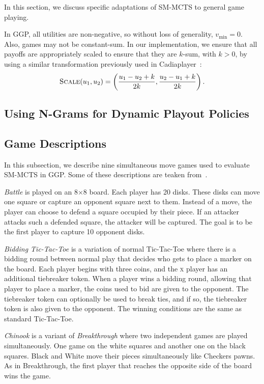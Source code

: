 \documentclass[conference]{IEEEtran}
\begin{document}
In this section, we discuss specific adaptations of SM-MCTS to general game playing.

In GGP, all utilities are non-negative, so without loss of generality, $v_{\min} = 0$. 
Also, games may not be constant-sum. In our implementation, we ensure that all payoffs 
are appropriately scaled to ensure that they are $k$-sum, with $k > 0$, by using 
a similar transformation previously used in Cadiaplayer~\cite{Finnsson12}:
\[ \text{\sc Scale}(u_1, u_2) = \left( \frac{u_1 - u_2 + k}{2k}, \frac{u_2 - u_1 + k}{2k} \right). \]

\subsection{Using N-Grams for Dynamic Playout Policies}

\subsection{Game Descriptions}

In this subsection, we describe nine simultaneous move games used to evaluate SM-MCTS in GGP. Some of these 
descriptions are teaken from~\cite[Appendix C]{Finnsson12}.

\textit{Battle} is played on an 8$\times$8 board. Each player has 20 disks. These disks can move one square or 
capture an opponent square next to them. Instead of a move, the player can choose to defend a square occupied by their 
piece. If an attacker attacks such a defended square, the attacker will be captured. The goal is to be the first player 
to capture 10 opponent disks. 

\textit{Bidding Tic-Tac-Toe} is a variation of normal Tic-Tac-Toe where there is a bidding round between 
normal play that decides who gets to place a marker on the board. Each player begins with three coins, and the 
\textsc{x} player has an additional tiebreaker token. When a player wins a bidding round, allowing that player to 
place a marker, the coins used to bid are given to the opponent. The tiebreaker token can optionally be used to break 
ties, and if so, the tiebreaker token is also given to the opponent. The winning conditions are the same as 
standard Tic-Tac-Toe. 

\textit{Chinook} is a variant of \textit{Breakthrough} where two independent games are played simultaneously. 
One game on the white squares and another one on the black squares. Black and White move their pieces simultaneously 
like Checkers pawns. As in Breakthrough, the first player that reaches the opposite side of the board wins the game. 
\end{document}
